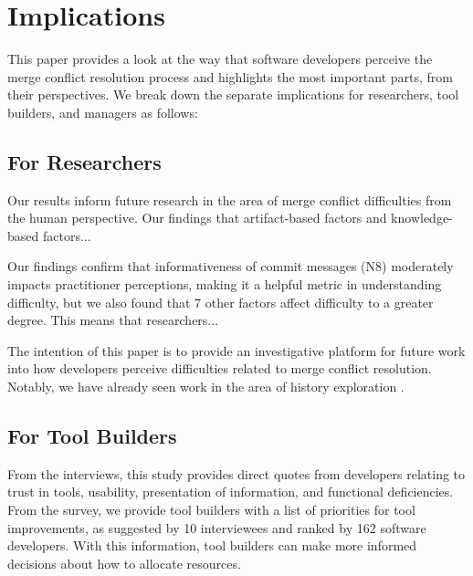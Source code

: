\section{Implications}\label{implications}

This paper provides a look at the way that software developers perceive the merge conflict resolution process and highlights the most important parts, from their perspectives. We break down the separate implications for researchers, tool builders, and managers as follows:

\subsection{For Researchers}
Our results inform future research in the area of merge conflict difficulties from the human perspective.
Our findings that artifact-based factors and knowledge-based factors...
 
Our findings confirm that informativeness of commit messages (N8) moderately impacts practitioner perceptions, making it a helpful metric in understanding difficulty, but we also found that 7 other factors affect difficulty to a greater degree. This means that researchers...

 
The intention of this paper is to provide an investigative platform for future work into how developers perceive difficulties related to merge conflict resolution. Notably, we have already seen work in the area of history exploration \cite{mihai_lenses}.

\subsection{For Tool Builders}
From the interviews, this study provides direct quotes from developers relating to trust in tools, usability, presentation of information, and functional deficiencies. From the survey, we provide tool builders with a list of priorities for tool improvements, as suggested by 10 interviewees and ranked by 162 software developers. With this information, tool builders can make more informed decisions about how to allocate resources.

